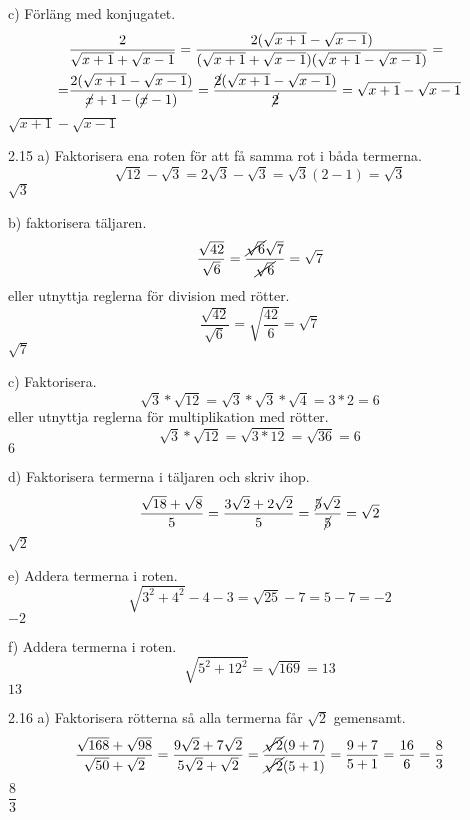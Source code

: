 \begin{task}{c)}
	Förläng med konjugatet.
	\begin{align*}
	&\dfrac{2}{\sqrt{x+1}+\sqrt{x-1}}=
	\dfrac{2(\sqrt{x+1}-\sqrt{x-1})}{(\sqrt{x+1}+\sqrt{x-1})(\sqrt{x+1}-\sqrt{x-1})}= \\ =
	&\dfrac{2(\sqrt{x+1}-\sqrt{x-1})}{\cancel{x}+1-(\cancel{x}-1)}=
	\dfrac{\cancel{2}(\sqrt{x+1}-\sqrt{x-1})}{\cancel{2}}=
	\sqrt{x+1}-\sqrt{x-1}
	\end{align*}
	\ans $\sqrt{x+1}-\sqrt{x-1}$
\end{task}

\begin{task}{2.15 a)}
	Faktorisera ena roten för att få samma rot i båda termerna.
	\[\sqrt{12}-\sqrt{3}=
	2\sqrt{3}-\sqrt{3}=
	\sqrt{3}(2-1)=
	\sqrt{3}\]
	\ans $\sqrt{3}$
\end{task}

\begin{task}{b)}
	faktorisera täljaren.
	\[\dfrac{\sqrt{42}}{\sqrt{6}}=
	\dfrac{\cancel{\sqrt{6}}\sqrt{7}}{\cancel{\sqrt{6}}}=
	\sqrt{7}\]
	eller utnyttja reglerna för division med rötter.
	\[\dfrac{\sqrt{42}}{\sqrt{6}}=\sqrt{\dfrac{42}{6}}=\sqrt{7}\]
	\ans $\sqrt{7}$
\end{task}

\begin{task}{c)}
	Faktorisera.
	\[\sqrt{3}*\sqrt{12}=
	\sqrt{3}*\sqrt{3}*\sqrt{4}=
	3*2=6\]
	eller utnyttja reglerna för multiplikation med rötter.
	\[\sqrt{3}*\sqrt{12}=
	\sqrt{3*12}=
	\sqrt{36}=
	6\]
	\ans $6$
\end{task}

\begin{task}{d)}
	Faktorisera termerna i täljaren och skriv ihop.
	\[\dfrac{\sqrt{18}+\sqrt{8}}{5}=
	\dfrac{3\sqrt{2}+2\sqrt{2}}{5}=
	\dfrac{\cancel{5}\sqrt{2}}{\cancel{5}}=
	\sqrt{2}\]
	\ans $\sqrt{2}$
\end{task}

\begin{task}{e)}
	Addera termerna i roten.
	\[\sqrt{3^2+4^2}-4-3=
	\sqrt{25}-7=
	5-7=
	-2\]
	\ans $-2$
\end{task}

\begin{task}{f)}
	Addera termerna i roten.
	\[\sqrt{5^2+12^2}=\sqrt{169}=13\]
	\ans $13$
\end{task}

\begin{task}{2.16 a)}
	Faktorisera rötterna så alla termerna får $\sqrt{2}$ gemensamt.
	\[\dfrac{\sqrt{168}+\sqrt{98}}{\sqrt{50}+\sqrt{2}}=
	\dfrac{9\sqrt{2}+7\sqrt{2}}{5\sqrt{2}+\sqrt{2}}=
	\dfrac{\cancel{\sqrt{2}}(9+7)}{\cancel{\sqrt{2}}(5+1)}=
	\dfrac{9+7}{5+1}=
	\dfrac{16}{6}=
	\dfrac{8}{3}\]
	\ans $\dfrac{8}{3}$
\end{task}